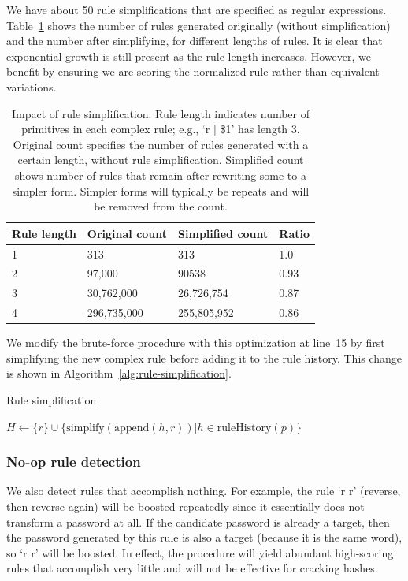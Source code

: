 \documentclass[letterpaper,twocolumn,10pt]{article}
\begin{document}
We have about 50 rule simplifications that are specified as regular
expressions. Table~\ref{tab:rule-simplification} shows the number of rules
generated originally (without simplification) and the number after simplifying,
for different lengths of rules. It is clear that exponential growth is still
present as the rule length increases. However, we benefit by ensuring we are
scoring the normalized rule rather than equivalent variations.

\begin{table}
\centering
\begin{tabular}{|l|l|l|l|}
\hline
Rule length & Original count & Simplified count & Ratio \\
\hline
1 & 313 & 313 & 1.0 \\
2 & 97,000 & 90538 & 0.93 \\
3 & 30,762,000 & 26,726,754 & 0.87 \\
4 & 296,735,000 & 255,805,952 & 0.86 \\
\hline
\end{tabular}
\caption{Impact of rule simplification. Rule length indicates number of
primitives in each complex rule; e.g., `r ] \$1' has length 3. Original count
specifies the number of rules generated with a certain length, without rule
simplification. Simplified count shows number of rules that remain after
rewriting some to a simpler form. Simpler forms will typically be repeats and
will be removed from the count.}
\label{tab:rule-simplification}
\end{table}

We modify the brute-force procedure with this optimization at line~15 by
first simplifying the new complex rule before adding it to the rule history.
This change is shown in Algorithm~\ref{alg:rule-simplification}.

\begin{algorithm}\caption{Rule simplification}
\begin{algorithmic}
    \State $H \gets \{r\}\cup\{\mathrm{simplify}(\mathrm{append}(h, r))|h \in%
\mathrm{ruleHistory}(p)\}$
\end{algorithmic}
\label{alg:rule-simplification}
\end{algorithm}

\subsubsection{No-op rule detection}

We also detect rules that accomplish nothing. For example, the rule `r r'
(reverse, then reverse again) will be boosted repeatedly since it essentially
does not transform a password at all. If the candidate password is already a
target, then the password generated by this rule is also a target (because it
is the same word), so `r r' will be boosted. In effect, the procedure will
yield abundant high-scoring rules that accomplish very little and will not be
effective for cracking hashes.
\end{document}
